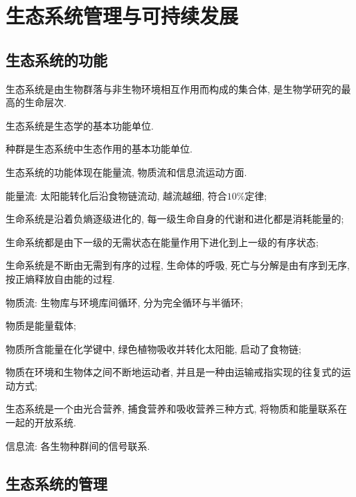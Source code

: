 \documentclass{ctexart}
\begin{document}
\section{生态系统管理与可持续发展} %
\label{sec:生态系统管理与可持续发展}

\subsection{生态系统的功能} %
\label{sub:生态系统的功能}

生态系统是由生物群落与非生物环境相互作用而构成的集合体, 是生物学研究的最高的生命层次.
\par
生态系统是生态学的基本功能单位.
\par
种群是生态系统中生态作用的基本功能单位.
\par
生态系统的功能体现在能量流, 物质流和信息流运动方面.
\begin{citem}
    \item 能量流: 太阳能转化后沿食物链流动, 越流越细, 符合$10\%$定律;
    \begin{cenum}
        \item 生命系统是沿着负熵逐级进化的, 每一级生命自身的代谢和进化都是消耗能量的;
        \item 生命系统都是由下一级的无需状态在能量作用下进化到上一级的有序状态;
        \item 生命系统是不断由无需到有序的过程, 生命体的呼吸, 死亡与分解是由有序到无序, 按正熵释放自由能的过程.
    \end{cenum}
    \item 物质流: 生物库与环境库间循环, 分为完全循环与半循环;
    \begin{cenum}
        \item 物质是能量载体;
        \item 物质所含能量在化学键中, 绿色植物吸收并转化太阳能, 启动了食物链;
        \item 物质在环境和生物体之间不断地运动者, 并且是一种由运输戒指实现的往复式的运动方式;
        \item 生态系统是一个由光合营养, 捕食营养和吸收营养三种方式, 将物质和能量联系在一起的开放系统.
    \end{cenum}
    \item 信息流: 各生物种群间的信号联系.
\end{citem}


\subsection{生态系统的管理} %
\label{sub:生态系统的管理}
\end{document}
